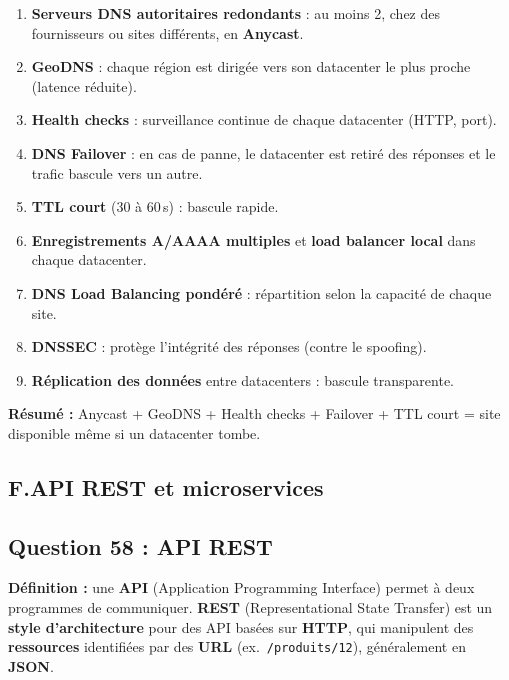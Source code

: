 \documentclass[12pt,a4paper]{article}
\begin{document}
\begin{enumerate}
  \item \textbf{Serveurs DNS autoritaires redondants} : au moins 2, chez des fournisseurs ou sites diff\'erents, en \textbf{Anycast}.
  \item \textbf{GeoDNS} : chaque r\'egion est dirig\'ee vers son datacenter le plus proche (latence r\'eduite).
  \item \textbf{Health checks} : surveillance continue de chaque datacenter (HTTP, port).
  \item \textbf{DNS Failover} : en cas de panne, le datacenter est retir\'e des r\'eponses et le trafic bascule vers un autre.
  \item \textbf{TTL court} (30 \`a 60\,s) : bascule rapide.
  \item \textbf{Enregistrements A/AAAA multiples} et \textbf{load balancer local} dans chaque datacenter.
  \item \textbf{DNS Load Balancing pond\'er\'e} : r\'epartition selon la capacit\'e de chaque site.
  \item \textbf{DNSSEC} : prot\`ege l'int\'egrit\'e des r\'eponses (contre le spoofing).
  \item \textbf{R\'eplication des donn\'ees} entre datacenters : bascule transparente.
\end{enumerate}

\noindent\textbf{R\'esum\'e :} Anycast + GeoDNS + Health checks + Failover + TTL court = site disponible m\^eme si un datacenter tombe.

\subsection*{F.API REST et microservices}

\subsection*{Question 58 : API REST}

\textbf{D\'efinition :} une \textbf{API} (Application Programming Interface) permet \`a deux programmes de communiquer. \textbf{REST} (Representational State Transfer) est un \textbf{style d'architecture} pour des API bas\'ees sur \textbf{HTTP}, qui manipulent des \textbf{ressources} identifi\'ees par des \textbf{URL} (ex.\ \texttt{/produits/12}), g\'en\'eralement en \textbf{JSON}.
\end{document}
